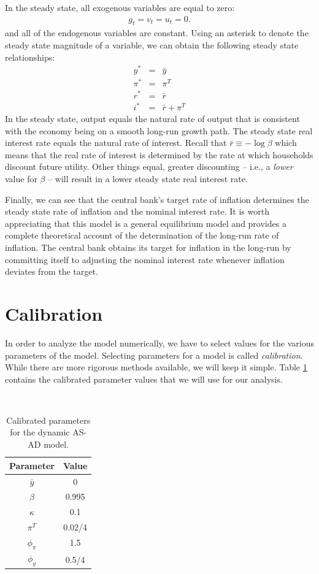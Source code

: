 \documentclass[12pt,fleqn]{article}
\newcommand{\EE}{\begin{eqnarray}}
\newcommand{\FF}{\end{eqnarray}}
\begin{document}
In the steady state, all exogenous variables are equal to zero:
	\EE
	g_t = v_t = u_t = 0.
	\FF
and all of the endogenous variables are constant. Using an asterisk to denote the steady state magnitude of a variable, we can obtain the following steady state relationships:
	\EE
	y^* & = & \bar{y}\\
	\pi^* & = & \pi^T\\
	r^* & = & \bar{r}\\
	i^* & = & \bar{r} + \pi^T
	\FF
In the steady state, output equals the natural rate of output that is consistent with the economy being on a smooth long-run growth path. The steady state real interest rate equals the natural rate of interest. Recall that $\bar{r} \equiv - \log  \beta$ which means that the real rate of interest is determined by the rate at which households discount future utility. Other things equal, greater discounting -- i.e., a \emph{lower} value for $\beta$ -- will result in a lower steady state real interest rate.

Finally, we can see that the central bank's target rate of inflation determines the steady state rate of inflation and the nominal interest rate. It is worth appreciating that this model is a general equilibrium model and provides a complete theoretical account of the determination of the long-run rate of inflation. The central bank obtains its target for inflation in the long-run by committing itself to adjusting the nominal interest rate whenever inflation deviates from the target.
	
\section{Calibration}

In order to analyze the model numerically, we have to select values for the various parameters of the model. Selecting parameters for a model is called \emph{calibration}. While there are more rigorous methods available, we will keep it simple. Table \ref{table_calib} contains the calibrated parameter values that we will use for our analysis.

\begin{table}[h] \caption{\label{table_calib} Calibrated parameters for the dynamic AS-AD model.}

\

\begin{center}\begin{tabular}{|c|c|} \hline \textbf{Parameter} & \textbf{Value}\\\hline
{\rule[3mm]{0mm}{0mm}} $\bar{y}$   & 0 \\
                       $\beta$     & 0.995\\
                       $\kappa$    & 0.1\\
                       $\pi^T$     & 0.02/4   \\
                       $\phi_{\pi}$& 1.5 \\
                       $\phi_{y}$  & 0.5/4\\\hline
\end{tabular}\end{center}
\end{table}
\end{document}
